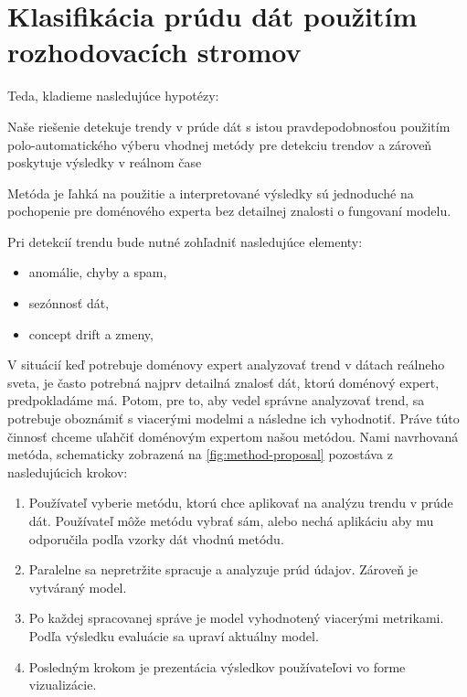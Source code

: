 \chapter{Klasifikácia prúdu dát použitím rozhodovacích stromov}
\label{Klasifikácia prúdu dát použitím rozhodovacích stromov}


Teda, kladieme nasledujúce hypotézy:
\begin{hypothesis}{Naše riešenie detekuje trendy v prúde dát s istou pravdepodobnosťou použitím polo-automatického výberu vhodnej metódy pre detekciu trendov a zároveň poskytuje výsledky v reálnom čase}
\end{hypothesis}
\begin{hypothesis}{Metóda je ľahká na použitie a interpretované výsledky sú jednoduché na pochopenie pre doménového experta bez detailnej znalosti o fungovaní modelu.}
\end{hypothesis}

Pri detekcií trendu bude nutné zohľadniť nasledujúce elementy:
\begin{itemize}
	\item anomálie, chyby a spam,
	\item sezónnosť dát,
	\item concept drift a zmeny,
\end{itemize}

V situácií keď potrebuje doménovy expert analyzovať trend v dátach reálneho sveta, je často potrebná najprv detailná znalosť dát, ktorú doménový expert, predpokladáme má. Potom, pre to, aby vedel správne analyzovať trend, sa potrebuje oboznámiť s viacerými modelmi a následne ich vyhodnotiť. Práve túto činnosť chceme uľahčiť doménovým expertom našou metódou. Nami navrhovaná metóda, schematicky zobrazená na \ref{fig:method-proposal} pozostáva z nasledujúcich krokov:
\begin{enumerate}
	\item Používateľ vyberie metódu, ktorú chce aplikovať na analýzu trendu v prúde dát. Používateľ môže metódu vybrať sám, alebo nechá aplikáciu aby mu odporučila podľa vzorky dát vhodnú metódu.
	\item Paralelne sa nepretržite spracuje a analyzuje prúd údajov. Zároveň je vytváraný model.
	\item Po každej spracovanej správe je model vyhodnotený viacerými metrikami. Podľa výsledku evaluácie sa upraví aktuálny model.
	\item Posledným krokom je prezentácia výsledkov používateľovi vo forme vizualizácie.
\end{enumerate}
\label{fig:method-proposal}


